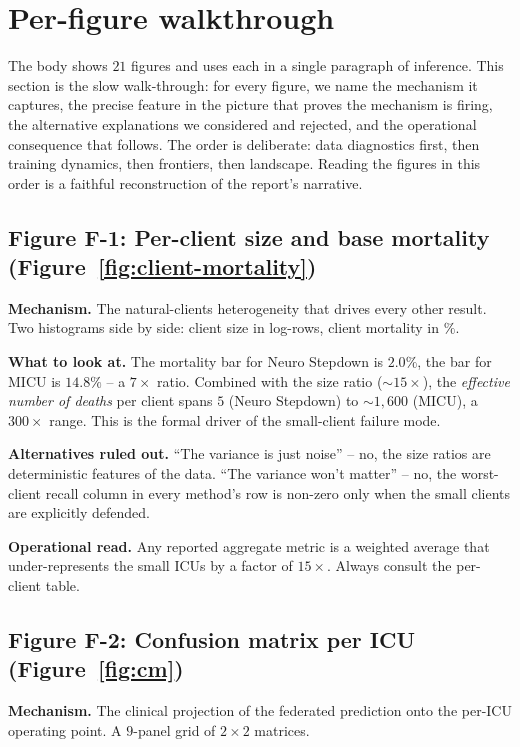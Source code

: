\section{Per-figure walkthrough}
\label{sec:figure-walkthrough}

The body shows $21$ figures and uses each in a single paragraph of
inference. This section is the slow walk-through: for every
figure, we name the mechanism it captures, the precise feature in
the picture that proves the mechanism is firing, the alternative
explanations we considered and rejected, and the operational
consequence that follows. The order is deliberate: data
diagnostics first, then training dynamics, then frontiers, then
landscape. Reading the figures in this order is a faithful
reconstruction of the report's narrative.

\subsection{Figure F-1: Per-client size and base mortality
(Figure~\ref{fig:client-mortality})}
\textbf{Mechanism.} The natural-clients heterogeneity that drives
every other result. Two histograms side by side: client size in
log-rows, client mortality in $\%$.

\textbf{What to look at.} The mortality bar for Neuro Stepdown is
$2.0\%$, the bar for MICU is $14.8\%$ -- a $7\!\times$ ratio.
Combined with the size ratio ($\sim$$15\!\times$), the
\emph{effective number of deaths} per client spans
$5$ (Neuro Stepdown) to $\sim$$1{,}600$ (MICU), a $300\!\times$
range. This is the formal driver of the small-client failure mode.

\textbf{Alternatives ruled out.} ``The variance is just noise'' --
no, the size ratios are deterministic features of the data. ``The
variance won't matter'' -- no, the worst-client recall column in
every method's row is non-zero only when the small clients are
explicitly defended.

\textbf{Operational read.} Any reported aggregate metric is a
weighted average that under-represents the small ICUs by a factor
of $15\!\times$. Always consult the per-client table.

\subsection{Figure F-2: Confusion matrix per ICU
(Figure~\ref{fig:cm})}
\textbf{Mechanism.} The clinical projection of the federated
prediction onto the per-ICU operating point. A $9$-panel grid of
$2\!\times\!2$ matrices.

